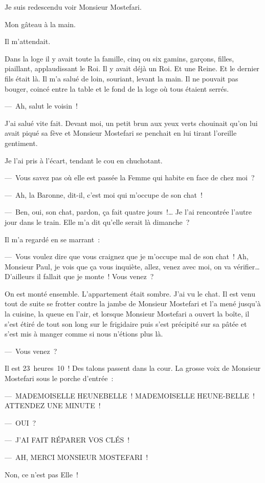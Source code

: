 \documentclass[twoside]{book} %
\begin{document}
Je suis redescendu voir Monsieur Mostefari.\par
Mon gâteau à la main.\par
Il m’attendait.\par
Dans la loge il y avait toute la famille, cinq ou six gamins, garçons, filles, piaillant, applaudissant le Roi. Il y avait déjà un Roi. Et une Reine. Et le dernier fils était là. Il m’a salué de loin, souriant, levant la main. Il ne pouvait pas bouger, coincé entre la table et le fond de la loge où tous étaient serrés.\par
— Ah, salut le voisin !\par
J’ai salué vite fait. Devant moi, un petit brun aux yeux verts chouinait qu’on lui avait piqué sa fève et Monsieur Mostefari se penchait en lui tirant l’oreille gentiment.\par
Je l’ai pris à l’écart, tendant le cou en chuchotant.\par
— Vous savez pas où elle est passée la Femme qui habite en face de chez moi ?\par
— Ah, la Baronne, dit-il, c’est moi qui m’occupe de son chat !\par
— Ben, oui, son chat, pardon, ça fait quatre jours !… Je l’ai rencontrée l’autre jour dans le train. Elle m’a dit qu’elle serait là dimanche ?\par
Il m’a regardé en se marrant :\par
— Vous voulez dire que vous craignez que je m’occupe mal de son chat ! Ah, Monsieur Paul, je vois que ça vous inquiète, allez, venez avec moi, on va vérifier… D’ailleurs il fallait que je monte ! Vous venez ?\par
On est monté ensemble. L’appartement était sombre. J’ai vu le chat. Il est venu tout de suite se frotter contre la jambe de Monsieur Mostefari et l’a mené jusqu’à la cuisine, la queue en l’air, et lorsque Monsieur Mostefari a ouvert la boîte, il s’est étiré de tout son long sur le frigidaire puis s’est précipité sur sa pâtée et s’est mis à manger comme si nous n’étions plus là.\par
— Vous venez ?\par
\bigbreak
\noindent Il est 23 heures 10 ! Des talons passent dans la cour. La grosse voix de Monsieur Mostefari sous le porche d’entrée :\par
— MADEMOISELLE HEUNEBELLE ! MADEMOISELLE HEUNE-BELLE ! ATTENDEZ UNE MINUTE !\par
— OUI ?\par
— J’AI FAIT RÉPARER VOS CLÉS !\par
— AH, MERCI MONSIEUR MOSTEFARI !\par
Non, ce n’est pas Elle !
\end{document}
